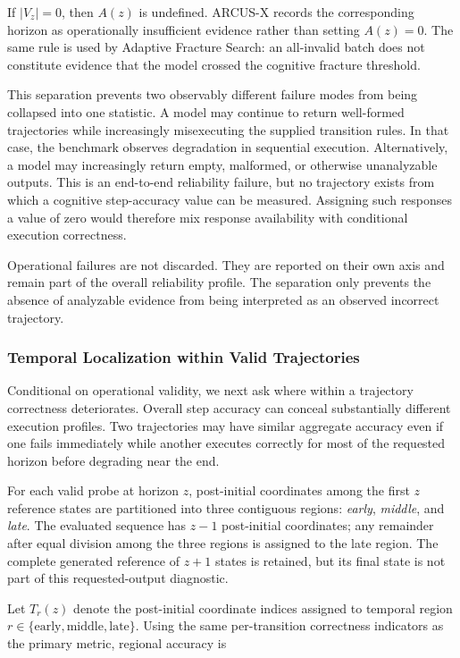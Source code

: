 \documentclass{article}
\begin{document}
If $|V_z|=0$, then $A(z)$ is undefined. ARCUS-X records the corresponding
horizon as operationally insufficient evidence rather than setting
$A(z)=0$. The same rule is used by Adaptive Fracture Search: an all-invalid
batch does not constitute evidence that the model crossed the cognitive
fracture threshold.

This separation prevents two observably different failure modes from being
collapsed into one statistic. A model may continue to return well-formed
trajectories while increasingly misexecuting the supplied transition rules. In
that case, the benchmark observes degradation in sequential execution.
Alternatively, a model may increasingly return empty, malformed, or otherwise
unanalyzable outputs. This is an end-to-end reliability failure, but no
trajectory exists from which a cognitive step-accuracy value can be measured.
Assigning such responses a value of zero would therefore mix response
availability with conditional execution correctness.

Operational failures are not discarded. They are reported on their own axis
and remain part of the overall reliability profile. The separation only
prevents the absence of analyzable evidence from being interpreted as an
observed incorrect trajectory.

\subsubsection{Temporal Localization within Valid Trajectories}
\label{app:temporal_localization}

Conditional on operational validity, we next ask where within a trajectory
correctness deteriorates. Overall step accuracy can conceal substantially
different execution profiles. Two trajectories may have similar aggregate
accuracy even if one fails immediately while another executes correctly for
most of the requested horizon before degrading near the end.

For each valid probe at horizon $z$, post-initial coordinates among the first
$z$ reference states are partitioned into three contiguous regions:
\emph{early}, \emph{middle}, and \emph{late}. The evaluated sequence has
$z-1$ post-initial coordinates; any remainder after equal division among the
three regions is assigned to the late region. The complete generated reference
of $z+1$ states is retained, but its final state is not part of this
requested-output diagnostic.

Let $T_r(z)$ denote the post-initial coordinate indices assigned to temporal region
$r \in \{\mathrm{early},\mathrm{middle},\mathrm{late}\}$. Using the same
per-transition correctness indicators as the primary metric, regional accuracy
is
\end{document}
